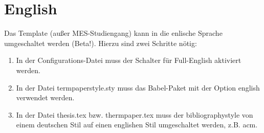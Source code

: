 %
\section{English}\label{sec:english}
Das Template (außer MES-Studiengang) kann in die enlische Sprache umgeschaltet werden (Beta!). Hierzu sind zwei Schritte nötig:

\begin{enumerate}
\item In der Configurations-Datei muss der Schalter für Full-English aktiviert werden.
\item In der Datei termpaperstyle.sty muss das Babel-Paket mit der Option english verwendet werden.
\item In der Datei thesis.tex bzw. thermpaper.tex muss der bibliographystyle von einem deutschen Stil auf einen englishen Stil umgeschaltet werden, z.B. acm.
\end{enumerate}

